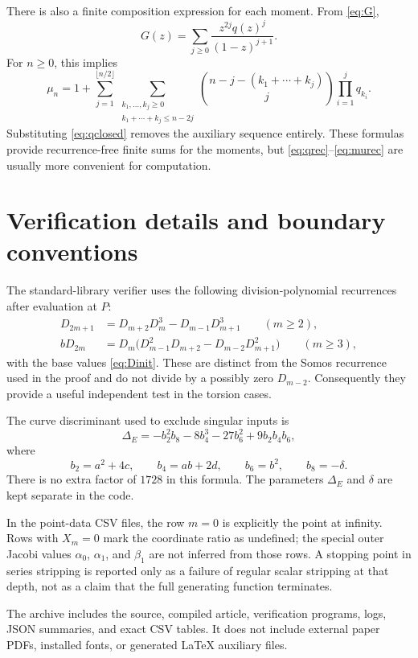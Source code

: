 \documentclass[11pt,letterpaper]{article}
\numberwithin{equation}{section}
\theoremstyle{definition}
\theoremstyle{remark}
\begin{document}
There is also a finite composition expression for each moment. From
\eqref{eq:G},
\[
 G(z)=\sum_{j\ge0}\frac{z^{2j}q(z)^j}{(1-z)^{j+1}}.
\]
For $n\ge0$, this implies
\begin{equation}\label{eq:muclosed}
 \mu_n=1+
 \sum_{j=1}^{\lfloor n/2\rfloor}
 \sum_{\substack{k_1,\ldots,k_j\ge0\\k_1+\cdots+k_j\le n-2j}}
 \binom{n-j-(k_1+\cdots+k_j)}{j}
 \prod_{i=1}^j q_{k_i}.
\end{equation}
Substituting \eqref{eq:qclosed} removes the auxiliary sequence entirely.
These formulas provide recurrence-free finite sums for the moments, but
\eqref{eq:qrec}--\eqref{eq:murec} are usually more convenient for computation.

\section{Verification details and boundary conventions}\label{app:verification}

The standard-library verifier uses the following division-polynomial
recurrences after evaluation at $P$:
\begin{align*}
 D_{2m+1}&=D_{m+2}D_m^3-D_{m-1}D_{m+1}^3\qquad(m\ge2),\\
 bD_{2m}&=D_m\bigl(D_{m-1}^2D_{m+2}-D_{m-2}D_{m+1}^2\bigr)
 \qquad(m\ge3),
\end{align*}
with the base values \eqref{eq:Dinit}. These are distinct from the
Somos recurrence used in the proof and do not divide by a possibly zero
$D_{m-2}$. Consequently they provide a useful independent test in the
torsion cases.

The curve discriminant used to exclude singular inputs is
\[
 \Delta_E=-b_2^2b_8-8b_4^3-27b_6^2+9b_2b_4b_6,
\]
where
\[
 b_2=a^2+4c,\qquad b_4=ab+2d,\qquad b_6=b^2,\qquad b_8=-\delta.
\]
There is no extra factor of $1728$ in this formula. The parameters
$\Delta_E$ and $\delta$ are kept separate in the code.

In the point-data CSV files, the row $m=0$ is explicitly the point at
infinity. Rows with $X_m=0$ mark the coordinate ratio as undefined; the
special outer Jacobi values $\alpha_0$, $\alpha_1$, and $\beta_1$ are
not inferred from those rows. A stopping point in series stripping is
reported only as a failure of regular scalar stripping at that depth,
not as a claim that the full generating function terminates.

The archive includes the source, compiled article, verification programs,
logs, JSON summaries, and exact CSV tables. It does not include external
paper PDFs, installed fonts, or generated LaTeX auxiliary files.
\end{document}
